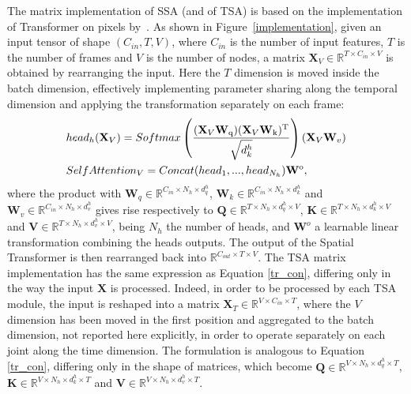 \documentclass[times,twocolumn,final,authoryear]{elsarticle}
\begin{document}
The matrix implementation of SSA (and of TSA) is based on the implementation of Transformer on pixels by~\cite{DBLP:journals/corr/abs-1904-09925}. As shown in Figure~\ref{implementation}, given an input tensor of shape $(C_{in},T,V)$, where $C_{in}$ is the number of input features, $T$ is the number of frames and $V$ is the number of nodes, a matrix $\mathbf{X}_V \in \mathbb{R}^{T \times C_{in} \times V}$ is obtained by rearranging the input. Here the $T$ dimension is moved inside the batch dimension, effectively implementing parameter sharing along the temporal dimension and applying the transformation separately on each frame:
\begin{equation}\label{tr_con}
\begin{aligned}
&head_h(\mathbf{X}_V)= Softmax \left( \frac{(\mathbf{X}_V\mathbf{W}\textsubscript{q})(\mathbf{X}_V\mathbf{W}\textsubscript{k})\textsuperscript{T}}{\sqrt{d^h_{k}}} \right)(\mathbf{X}_V\mathbf{W}_v) \\
&SelfAttention_V=Concat(head\textsubscript{1},...,head_{N_h})\mathbf{W}\textsuperscript{o}  ,
\end{aligned}
\end{equation}
where the product with $\mathbf{W}_q \in \mathbb{R}^{C_{in} \times N_h \times d^h_q}$, $\mathbf{W}_k \in \mathbb{R}^{C_{in} \times N_h \times d^h_k}$ and $\mathbf{W}_v \in \mathbb{R}^{C_{in} \times N_h \times d^h_v}$ gives rise respectively to $\mathbf{Q} \in \mathbb{R}^{T \times N_h \times d^h_q \times V}$, $\mathbf{K} \in \mathbb{R}^{T \times N_h \times d^h_k \times V}$ and $\mathbf{V} \in \mathbb{R}^{T \times N_h \times d^h_v \times V}$, being $N_h$ the number of heads, and $\mathbf{W}^o$ a learnable linear transformation combining the heads outputs. 
The output of the Spatial Transformer is then rearranged back into $\mathbb{R}^{C_{out} \times T \times V}$. The TSA matrix implementation has the same expression as Equation \eqref{tr_con}, differing only in the way the input $\mathbf{X}$ is processed. Indeed, in order to be processed by each TSA module, the input is reshaped into a matrix $\mathbf{X}_T \in \mathbb{R}^{V \times C_{in} \times T}$, where the $V$ dimension has been moved in the first position and aggregated to the batch dimension, not reported here explicitly, in order to operate separately on each joint along the time dimension. 
The formulation is analogous to Equation \eqref{tr_con}, differing only in the shape of matrices, which become $\mathbf{Q} \in \mathbb{R}^{V \times N_h \times d^h_q \times T}$, $\mathbf{K} \in \mathbb{R}^{V \times N_h \times d^h_k \times T}$ and $\mathbf{V} \in \mathbb{R}^{V \times N_h \times d^h_v \times T}$.
\end{document}
